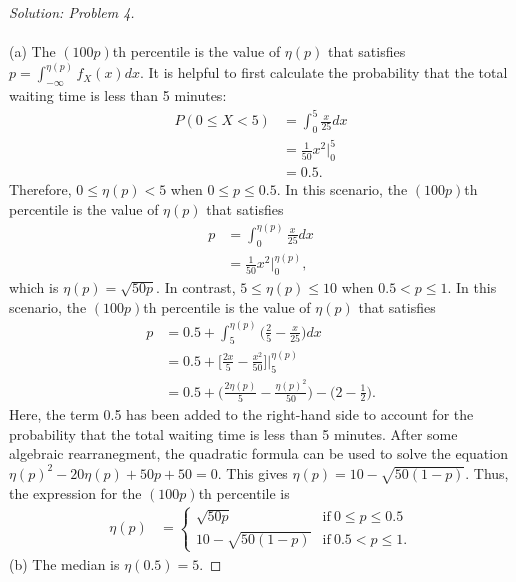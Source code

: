 \documentclass[10pt]{article}
\begin{document}
\vspace{0.2cm}
\begin{proof}[Solution: Problem 4]
\text{}\\
\text{}\\
(a)
The $(100p)$th percentile is the value of $\eta(p)$ that satisfies $p = \int^{\eta(p)}_{-\infty} f_X(x)dx$. It is helpful to first calculate the probability that the total waiting time is less than 5 minutes:
\begin{align*}
P(0 \leq X < 5) &= \int^{5}_{0} \frac{x}{25}dx\\
&= \frac{1}{50}x^2\bigg|^5_0 \\
&= 0.5.
\end{align*}
Therefore, $0 \leq \eta(p) < 5$ when $0 \leq p \leq 0.5$. In this scenario, the $(100p)$th percentile is the value of $\eta(p)$ that satisfies
\begin{align*}
p &= \int^{\eta(p)}_0 \frac{x}{25}dx\\
&= \frac{1}{50}x^2\bigg|^{\eta(p)}_0,
\end{align*}
which is $\eta(p) = \sqrt{50p}$. 
In contrast,  $5 \leq \eta(p) \leq 10$ when $0.5 < p \leq 1$. In this scenario, the $(100p)$th percentile is the value of $\eta(p)$ that satisfies
\begin{align*}
p &= 0.5 + \int^{\eta(p)}_5 \bigg(\frac{2}{5} -\frac{x}{25}\bigg)dx\\
&=  0.5 + \bigg[\frac{2x}{5} -\frac{x^2}{50}\bigg]\bigg|^{\eta(p)}_5\\
&=  0.5 + \bigg(\frac{2\eta(p)}{5} -\frac{\eta(p)^2}{50}\bigg) - \bigg(2 -\frac{1}{2}\bigg).
\end{align*}
Here, the term 0.5 has been added to the right-hand side to account for the probability that the total waiting time is less than 5 minutes. After some algebraic rearranegment, the quadratic formula can be used to solve the equation $\eta(p)^2 - 20\eta(p) + 50p + 50 = 0$. This gives $\eta(p) = 10 - \sqrt{50(1-p)}$. Thus, the expression for the $(100p)$th percentile is
\begin{align*}
    \eta(p) &= 
    \begin{cases}
      \sqrt{50p} & \text{if}\ 0 \leq p \leq 0.5 \\
      10 - \sqrt{50(1-p)} & \text{if}\ 0.5 < p \leq 1.
    \end{cases}
\end{align*}
(b) The median is $\eta(0.5) = 5$.
\end{proof}
\end{document}
